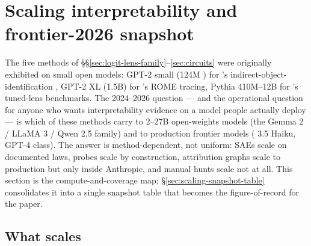 
\section{Scaling interpretability and frontier-2026 snapshot}
\label{sec:scaling-snapshot}

The five methods of \S\S\ref{sec:logit-lens-family}--\ref{sec:circuits}
were originally exhibited on small open models: GPT-2 small (124M
) for \citet{wang2022-ioi}'s indirect-object-identification
, GPT-2 XL (1.5B) for \citet{meng2022-rome}'s ROME tracing,
Pythia 410M--12B for \citet{belrose2023-tuned-lens}'s tuned-lens
benchmarks. The 2024--2026 question --- and the operational question for
anyone who wants interpretability evidence on a model people actually
deploy --- is which of these methods carry to 2--27B open-weights models
(the Gemma 2 / LLaMA 3 / Qwen 2.5 family) and to production frontier
models ( 3.5 Haiku, GPT-4 class). The answer is method-dependent,
not uniform: SAEs scale on documented laws, probes scale by construction,
attribution graphs scale to production but only inside Anthropic, and
manual  hunts scale not at all. This section is the
compute-and-coverage map; \S\ref{sec:scaling-snapshot-table} consolidates
it into a single snapshot table that becomes the figure-of-record for
the paper.

\subsection{What scales}
\label{sec:scaling-yes}

